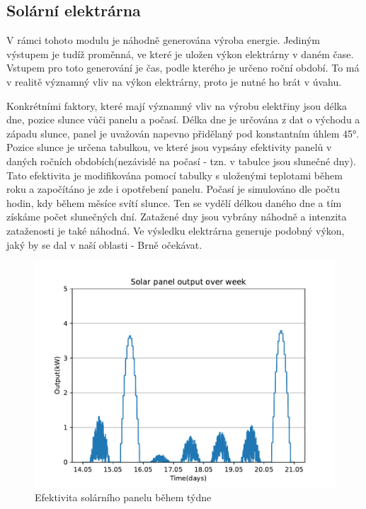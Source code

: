 \documentclass[12pt,a4paper]{article}
\begin{document}
\subsection{Solární elektrárna}
V rámci tohoto modulu je náhodně generována výroba energie.
Jediným výstupem je tudíž proměnná, ve které je uložen výkon elektrárny v daném čase.
Vstupem pro toto generování je čas, podle kterého je určeno roční období.
To má v realitě významný vliv na výkon elektrárny, proto je nutné ho brát v úvahu.

Konkrétními faktory, které mají významný vliv na výrobu elektřiny jsou délka dne, pozice slunce vůči panelu a počasí.
Délka dne je určována z dat o východu a západu slunce, panel je uvažován napevno přidělaný pod konstantním úhlem 45°.
Pozice slunce je určena tabulkou, ve které jsou vypsány efektivity panelů v daných ročních obdobích(nezávislé na počasí - tzn. v tabulce jsou slunečné dny).
Tato efektivita je modifikována pomocí tabulky s uloženými teplotami během roku a započítáno je zde i opotřebení panelu.
Počasí je simulováno dle počtu hodin, kdy během měsíce svítí slunce. Ten se vydělí délkou daného dne a tím získáme počet slunečných dní.
Zatažené dny jsou vybrány náhodně a intenzita zataženosti je také náhodná.
Ve výsledku elektrárna generuje podobný výkon, jaký by se dal v naší oblasti - Brně očekávat.

\begin{figure}
\includegraphics[width=\linewidth]{img/plot_solar_week.pdf}
\caption{Efektivita solárního panelu během týdne}
\label{fig:plot_solar_week}
\end{figure}
\end{document}
